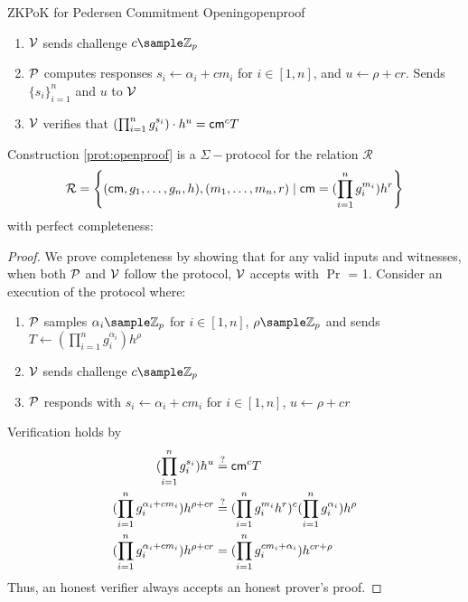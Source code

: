 {\begin{protocol}{ZKPoK for Pedersen Commitment Opening}{openproof}
\begin{enumerate}
        \item $\mathcal{V}$ sends challenge $c \sample \Z_p$
    
        \item $\mathcal{P}$ computes responses $s_i \gets \alpha_i + cm_i$ for $i \in [1,n]$, and $u \gets \rho + cr$. Sends $\{s_i\}_{i=1}^n$ and $u$ to $\mathcal{V}$
    
        \item $\mathcal{V}$ verifies that $ (\prod_{i=1}^ng_i^{s_i})\cdot h^u = \mathsf{cm}^cT$
    \end{enumerate}
\end{protocol}

\begin{theorem}
    Construction \ref{prot:openproof} is a $\Sigma-$protocol for the relation $\mathcal{R}$
    \[
        \mathcal{R} = \left\{ (\mathsf{cm},g_1,\dots,g_n,h),(m_1,\dots,m_n,r) \; | \; \mathsf{cm} = (\prod_{i=1}^ng_i^{m_i})h^r \right\}
    \]
    with perfect completeness: 
\end{theorem}


\begin{proof}
    We prove completeness by showing that for any valid inputs and witnesses, when both $\mathcal{P}$ and $\mathcal{V}$ follow the protocol, $\mathcal{V}$ accepts with $\Pr$ = 1.
    Consider an execution of the protocol where:
    \begin{enumerate}
        \item $\mathcal{P}$ samples $\alpha_i \sample \Z_p$ for $i \in [1,n]$, $\rho \sample \Z_p$ and sends $T \gets (\prod_{i=1}^n g_i^{\alpha_i})h^{\rho}$
        \item $\mathcal{V}$ sends challenge $c \sample \Z_p$
        \item $\mathcal{P}$ responds with $s_i \gets \alpha_i + cm_i$ for $i \in [1,n]$, $u \gets \rho + cr$
    \end{enumerate}
    Verification holds by 
    \begin{align}
        (\prod_{i=1}^n g_i^{s_i})h^u &\stackrel{?}{=} \mathsf{cm}^cT \notag \\
        (\prod_{i=1}^n g_i^{\alpha_i + cm_i})h^{\rho + cr} &\stackrel{?}{=} (\prod_{i=1}^n g_i^{m_i}h^r)^c(\prod_{i=1}^n g_i^{\alpha_i})h^{\rho} \notag  \\
        (\prod_{i=1}^n g_i^{\alpha_i + cm_i})h^{\rho + cr} &= (\prod_{i=1}^n g_i^{cm_i + \alpha_i})h^{cr + \rho} \notag 
    \end{align}
    Thus, an honest verifier always accepts an honest prover's proof.
\end{proof}




}
